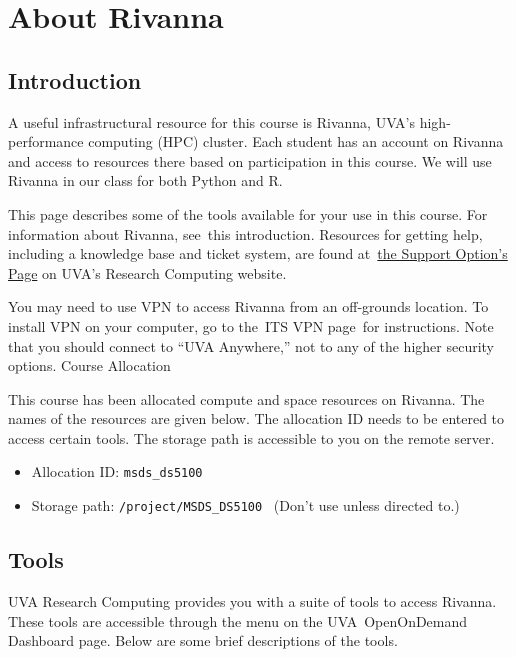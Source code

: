 \documentclass[
  letterpaper,
  DIV=11,
  numbers=noendperiod]{scrreport}
\providecommand{\tightlist}{%
  \setlength{\itemsep}{0pt}\setlength{\parskip}{0pt}}\usepackage{longtable,booktabs,array}
\begin{document}
\hypertarget{about-rivanna}{%
\chapter{About Rivanna}\label{about-rivanna}}

\hypertarget{introduction}{%
\section{Introduction}\label{introduction}}

A useful infrastructural resource for this course is Rivanna, UVA's
high-performance computing (HPC) cluster. Each student has an account on
Rivanna and access to resources there based on participation in this
course. We will use Rivanna in our class for both Python and R.~

This page describes some of the tools available for your use in this
course. For information about Rivanna, see~this introduction. Resources
for getting help, including a knowledge base and ticket system, are
found at~\href{http://www.rc.virginia.edu/support/}{the Support Option's
Page} on UVA's Research Computing website.

You may need to use VPN to access Rivanna from an off-grounds location.
To install VPN on your computer, go to the~ITS VPN page~for
instructions. Note that you should connect to ``UVA Anywhere,'' not to
any of the higher security options. Course Allocation

This course has been allocated compute and space resources on Rivanna.
The names of the resources are given below. The allocation ID needs to
be entered to access certain tools. The storage path is accessible to
you on the remote server.

\begin{itemize}
\tightlist
\item
  Allocation ID: \texttt{msds\_ds5100}
\item
  Storage path: \texttt{/project/MSDS\_DS5100}~ (Don't use unless
  directed to.)
\end{itemize}

\hypertarget{tools}{%
\section{Tools~}\label{tools}}

UVA Research Computing provides you with a suite of tools to access
Rivanna. These tools are accessible through the menu on the
UVA~OpenOnDemand Dashboard page. Below are some brief descriptions of
the tools.
\end{document}

